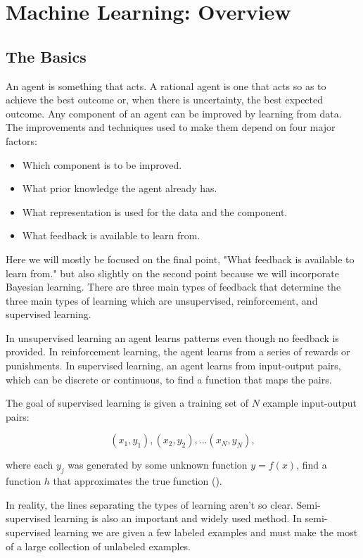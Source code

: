 \chapter{Machine Learning: Overview}
\section{The Basics}


An agent is something that acts. A rational agent is one that acts so as to achieve the best outcome or, when there is uncertainty, the best expected outcome. Any component of an agent can be improved by learning from data. The improvements and techniques used to make them depend on four major factors:

\begin{itemize}
  \item Which component is to be improved.
  \item What prior knowledge the agent already has.
  \item What representation is used for the data and the component.
  \item What feedback is available to learn from.  
\end{itemize}

Here we will mostly be focused on the final point, "What feedback is available to learn from." but also slightly on the second point because we will incorporate Bayesian learning. There are three main types of feedback that determine the three main types of learning which are unsupervised, reinforcement, and supervised learning. 

In unsupervised learning an agent learns patterns even though no feedback is provided. In reinforcement learning, the agent learns from a series of rewards or punishments. In supervised learning, an agent learns from input-output pairs, which can be discrete or continuous, to find a function that maps the pairs. 

The goal of supervised learning is given a training set of $N$ example input-output pairs:

\[(x_1, y_1), (x_2,y_2),... (x_N,y_N),\]

where each $y_j$ was generated by some unknown function $y=f(x)$, find a function $h$ that approximates the true function
(\cite{russell2009artificial}).

In reality, the lines separating the types of learning aren't so clear. Semi-supervised learning is also an important and widely used method. In semi-supervised learning we are given a few labeled examples and must make the most of a large collection of unlabeled examples. 

